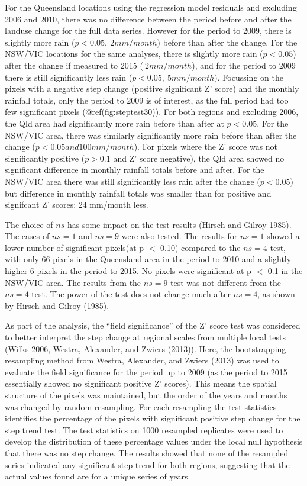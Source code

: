 \documentclass[fleqn,10pt,lineno]{wlpeerj} %
\begin{document}
For the Queensland locations using the regression model residuals and
excluding 2006 and 2010, there was no difference between the period
before and after the landuse change for the full data series. However
for the period to 2009, there is slightly more rain
(\(p < 0.05, ~ 2mm/month\)) before than after the change. For the
NSW/VIC locations for the same analyses, there is slightly more rain
(\(p < 0.05\)) after the change if measured to 2015 (\(~ 2 mm/month\)),
and for the period to 2009 there is still significantly less rain
(\(p < 0.05, ~ 5 mm/month\)). Focussing on the pixels with a negative
step change (positive significant Z' score) and the monthly rainfall
totals, only the period to 2009 is of interest, as the full period had
too few significant pixels (@ref(fig:steptest30)). For both regions and
excluding 2006, the Qld area had significantly more rain before than
after at \(p < 0.05\). For the NSW/VIC area, there was similarly
significantly more rain before than after the change
(\(p < 0.05 and 100mm/month\)). For pixels where the Z' score was not
significantly positive (\(p > 0.1\) and Z' score negative), the Qld area
showed no significant difference in monthly rainfall totals before and
after. For the NSW/VIC area there was still significantly less rain
after the change (\(p < 0.05\)) but difference in monthly rainfall
totals was smaller than for positive and signifcant Z' scores: 24
mm/month less.

The choice of \(ns\) has some impact on the test results (Hirsch and
Gilroy 1985). The cases of \(ns = 1\) and \(ns = 9\) were also tested.
The results for \(ns = 1\) showed a lower number of significant
pixels(at p \(<\) 0.10) compared to the \(ns = 4\) test, with only 66
pixels in the Queensland area in the period to 2010 and a slightly
higher 6 pixels in the period to 2015. No pixels were significant at p
\(<\) 0.1 in the NSW/VIC area. The results from the \(ns = 9\) test was
not different from the \(ns = 4\) test. The power of the test does not
change much after \(ns = 4\), as shown by Hirsch and Gilroy (1985).

As part of the analysis, the ``field significance'' of the Z' score test
was considered to better interpret the step change at regional scales
from multiple local tests (Wilks 2006, Westra, Alexander, and Zwiers
(2013)). Here, the bootstrapping resampling method from Westra,
Alexander, and Zwiers (2013) was used to evaluate the field significance
for the period up to 2009 (as the period to 2015 essentially showed no
significant positive Z' scores). This means the spatial structure of the
pixels was maintained, but the order of the years and months was changed
by random resampling. For each resampling the test statistics identifies
the percentage of the pixels with significant positive step change for
the step trend test. The test statistics on 1000 resampled replicates
were used to develop the distribution of these percentage values under
the local null hypothesis that there was no step change. The results
showed that none of the resampled series indicated any significant step
trend for both regions, suggesting that the actual values found are for
a unique series of years.
\end{document}
